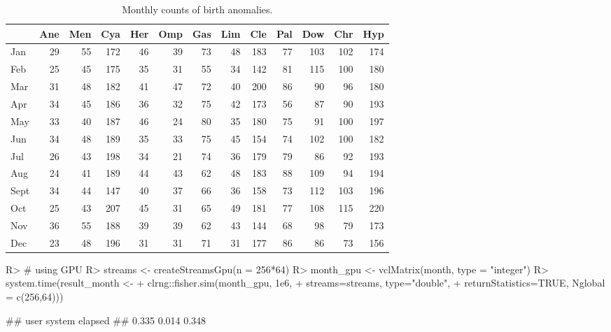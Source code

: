 \documentclass[article,nojss]{jss}\usepackage[]{graphicx}\usepackage[]{color}
\begin{document}
\begin{table}

\caption{\label{tab:monthdata}Monthly counts of birth anomalies.\label{tab:month}}
\centering
\begin{tabular}[t]{lrrrrrrrrrrrr}
\toprule
  & Ane & Men & Cya & Her & Omp & Gas & Lim & Cle & Pal & Dow & Chr & Hyp\\
\midrule
Jan & 29 & 55 & 172 & 46 & 39 & 73 & 48 & 183 & 77 & 103 & 102 & 174\\
Feb & 25 & 45 & 175 & 35 & 31 & 55 & 34 & 142 & 81 & 115 & 100 & 180\\
Mar & 31 & 48 & 182 & 41 & 47 & 72 & 40 & 200 & 86 & 90 & 96 & 180\\
Apr & 34 & 45 & 186 & 36 & 32 & 75 & 42 & 173 & 56 & 87 & 90 & 193\\
May & 33 & 40 & 187 & 46 & 24 & 80 & 35 & 180 & 75 & 91 & 100 & 197\\
Jun & 34 & 48 & 189 & 35 & 33 & 75 & 45 & 154 & 74 & 102 & 100 & 182\\
Jul & 26 & 43 & 198 & 34 & 21 & 74 & 36 & 179 & 79 & 86 & 92 & 193\\
Aug & 24 & 41 & 189 & 44 & 43 & 62 & 48 & 183 & 88 & 109 & 94 & 194\\
Sept & 34 & 44 & 147 & 40 & 37 & 66 & 36 & 158 & 73 & 112 & 103 & 196\\
Oct & 25 & 43 & 207 & 45 & 31 & 65 & 49 & 181 & 77 & 108 & 115 & 220\\
Nov & 36 & 55 & 188 & 39 & 39 & 62 & 43 & 144 & 68 & 98 & 79 & 173\\
Dec & 23 & 48 & 196 & 31 & 31 & 71 & 31 & 177 & 86 & 86 & 73 & 156\\
\bottomrule
\end{tabular}
\end{table}





\begin{CodeChunk}
\begin{CodeInput}
R> # using GPU
R> streams <- createStreamsGpu(n = 256*64)
R> month_gpu <- vclMatrix(month, type = "integer")
R> system.time(result_month <- 
+  clrng::fisher.sim(month_gpu, 1e6, 
+     streams=streams, type="double", 
+     returnStatistics=TRUE,  Nglobal = c(256,64)))
\end{CodeInput}
\begin{CodeOutput}
##    user  system elapsed 
##   0.335   0.014   0.348
\end{CodeOutput} 
\end{CodeChunk} 
\end{document}
